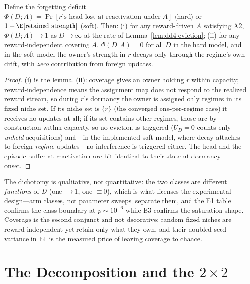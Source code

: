 \begin{proposition}
\label{prop:dd4-dichotomy}
Define the forgetting deficit
$\Phi(D; A) = \Pr[\text{$r$'s head lost at reactivation under } A]$
(hard) or $1 - \E[\text{retained strength}]$ (soft). Then:
(i) for any reward-driven $A$ satisfying A2,
$\Phi(D; A) \to 1$ as $D \to \infty$ at the rate of
Lemma~\ref{lem:dd4-eviction}; (ii) for any reward-independent covering
$A$, $\Phi(D; A) = 0$ for all $D$ in the hard model, and in the soft
model the owner's strength in $r$ decays only through the regime's own
drift, with \emph{zero} contribution from foreign updates.
\end{proposition}

\begin{proof}
(i) is the lemma. (ii): coverage gives an owner holding $r$ within
capacity; reward-independence means the assignment map does not respond
to the realized reward stream, so during $r$'s dormancy the owner is
assigned only regimes in its fixed niche set. If its niche set is
$\{r\}$ (the converged one-per-regime case) it receives no updates at
all; if its set contains other regimes, those are by construction
within capacity, so no eviction is triggered ($U_D = 0$ counts only
\emph{unheld} acquisitions) and---in the implemented soft model, where
decay attaches to foreign-\emph{regime} updates---no interference is
triggered either. The head and the episode buffer at reactivation are
bit-identical to their state at dormancy onset.
\end{proof}

\begin{keypoint}
The dichotomy is qualitative, not quantitative: the two classes are
different \emph{functions} of $D$ (one $\to 1$, one $\equiv 0$), which
is what licenses the experimental design---arm classes, not parameter
sweeps, separate them, and the E1 table confirms the class boundary at
$p \sim 10^{-6}$ while E3 confirms the saturation shape. Coverage is the
second conjunct and not decorative: random fixed niches are
reward-independent yet retain only what they own, and their doubled seed
variance in E1 is the measured price of leaving coverage to chance.
\end{keypoint}

\section{The Decomposition and the $2{\times}2$}
\label{sec:dd4-decomp}

